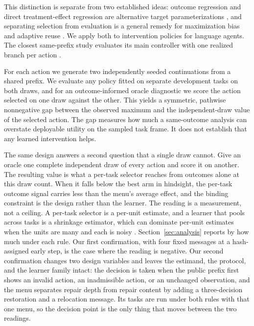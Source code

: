 This distinction is separate from two established ideas: outcome regression and direct treatment-effect regression are alternative target parameterizations \citep{kunzel2019metalearners}, and separating selection from evaluation is a general remedy for maximization bias and adaptive reuse \citep{vanhasselt2010double,dwork2015generalization}. We apply both to intervention policies for language agents. The closest same-prefix study evaluates its main controller with one realized branch per action \citep{zhang2026calibration}.

For each action we generate two independently seeded continuations from a shared prefix. We evaluate any policy fitted on separate development tasks on both draws, and for an outcome-informed oracle diagnostic we score the action selected on one draw against the other. This yields a symmetric, pathwise nonnegative gap between the observed maximum and the independent-draw value of the selected action. The gap measures how much a same-outcome analysis can overstate deployable utility on the sampled task frame. It does not establish that any learned intervention helps.

The same design answers a second question that a single draw cannot. Give an oracle one complete independent draw of every action and score it on another. The resulting value is what a per-task selector reaches from outcomes alone at this draw count. When it falls below the best arm in hindsight, the per-task outcome signal carries less than the menu's average effect, and the binding constraint is the design rather than the learner. The reading is a measurement, not a ceiling. A per-task selector is a per-unit estimate, and a learner that pools across tasks is a shrinkage estimator, which can dominate per-unit estimates when the units are many and each is noisy \citep{efron1975stein}. Section~\ref{sec:analysis} reports by how much under each rule. Our first confirmation, with four fixed messages at a hash-assigned early step, is the case where the reading is negative. Our second confirmation changes two design variables and leaves the estimand, the protocol, and the learner family intact: the decision is taken when the public prefix first shows an invalid action, an inadmissible action, or an unchanged observation, and the menu separates repair depth from repair content by adding a three-decision restoration and a relocation message. Its tasks are run under both rules with that one menu, so the decision point is the only thing that moves between the two readings.

